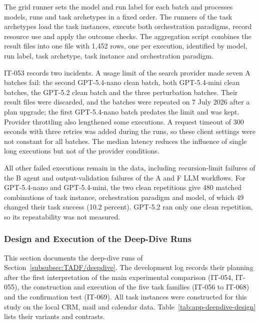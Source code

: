 The grid runner sets the model and run label for each batch and processes models, runs and task archetypes in a fixed order. The runners of the task archetypes load the task instances, execute both orchestration paradigms, record resource use and apply the outcome checks. The aggregation script combines the result files into one file with 1,452 rows, one per execution, identified by model, run label, task archetype, task instance and orchestration paradigm.

IT-053 records two incidents. A usage limit of the search provider made seven A batches fail: the second GPT-5.4-nano clean batch, both GPT-5.4-mini clean batches, the GPT-5.2 clean batch and the three perturbation batches. Their result files were discarded, and the batches were repeated on 7 July 2026 after a plan upgrade; the first GPT-5.4-nano batch predates the limit and was kept. Provider throttling also lengthened some executions. A request timeout of 300 seconds with three retries was added during the runs, so these client settings were not constant for all batches. The median latency reduces the influence of single long executions but not of the provider conditions.

All other failed executions remain in the data, including recursion-limit failures of the B agent and output-validation failures of the A and F LLM workflows. For GPT-5.4-nano and GPT-5.4-mini, the two clean repetitions give 480 matched combinations of task instance, orchestration paradigm and model, of which 49 changed their task success (10.2 percent). GPT-5.2 ran only one clean repetition, so its repeatability was not measured.

\subsubsection{Design and Execution of the Deep-Dive Runs}
\label{app:protocol/deepdive}

This section documents the deep-dive runs of Section~\ref{subsubsec:TADF/deepdive}. The development log records their planning after the first interpretation of the main experimental comparison (IT-054, IT-055), the construction and execution of the five task families (IT-056 to IT-068) and the confirmation test (IT-069). All task instances were constructed for this study on the local CRM, mail and calendar data. Table~\ref{tab:app-deepdive-design} lists their variants and contrasts.

